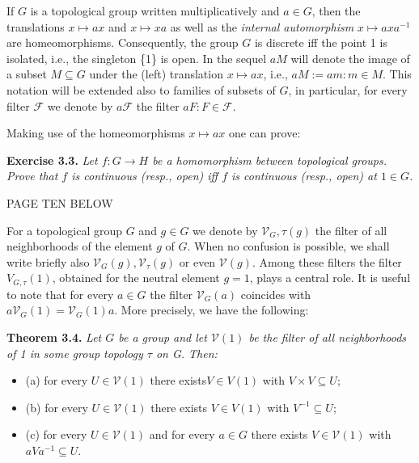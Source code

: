 \documentclass[12pt]{article}
\begin{document}
    If $G$ is a topological group written multiplicatively and $a \in G$, then the translations $x \mapsto ax$ and $x \mapsto xa$
as well as the \emph{internal automorphism} $x \mapsto axa^{-1}$ are homeomorphisms. Consequently, the group $G$ is discrete
iff the point 1 is isolated, i.e., the singleton \{1\} is open. In the sequel $aM$ will denote the image of a subset
$M \subseteq G$ under the (left) translation $x \mapsto ax$, i.e., $aM := {am : m \in M}$. This notation will be extended also to
families of subsets of $G$, in particular, for every filter $\mathcal{F}$ we denote by $a \mathcal{F}$ the filter ${aF : F \in \mathcal{F}}$.


    Making use of the homeomorphisms $x \mapsto ax$ one can prove:


\textbf{Exercise 3.3.} \emph{Let $f : G \to H$ be a homomorphism between topological groups. Prove that $f$ is continuous
(resp., open) iff $f$ is continuous (resp., open) at $1 \in G$.}



    PAGE TEN BELOW



    For a topological group $G$ and $g \in G$ we denote by $\mathcal{V}_G,\tau (g)$ the filter of all neighborhoods of the element $g$
of $G$. When no confusion is possible, we shall write briefly also $\mathcal{V}_G(g), \mathcal{V}_{\tau} (g)$ or even $\mathcal{V}(g)$. Among these filters
the filter $V_{G,\tau} (1)$, obtained for the neutral element $g = 1$, plays a central role. It is useful to note that for every
$a \in G$ the filter $\mathcal{V}_G (a)$ coincides with $a \mathcal{V}_G (1) = \mathcal{V}_G (1) a$. More precisely, we have the following:


\textbf{Theorem 3.4.} \emph{Let $G$ be a group and let $\mathcal{V}(1)$ be the filter of all neighborhoods of 1 in some group topology $\tau$
on G. Then:}


\begin{itemize}

    \item (a) for every $U \in \mathcal{V}(1)$ there exists$ V \in V(1)$ with $V \times V \subseteq U$;

    \item (b) for every $U \in \mathcal{V}(1)$ there exists $V \in V(1)$ with $V^{-1} \subseteq U$;

    \item (c) for every $U \in \mathcal{V}(1)$ and for every $a \in G$ there exists $V \in \mathcal{V}(1)$ with $aV a^{-1} \subseteq U$.

\end{itemize}
\end{document}
